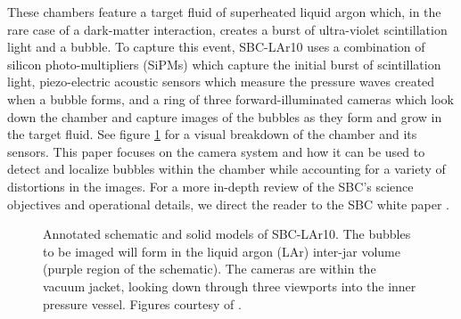 \documentclass[11pt, letterpaper]{extarticle} %
\begin{document}
These chambers feature a target fluid of superheated liquid argon which, in the rare case of a dark-matter interaction, creates a burst of ultra-violet scintillation light and a bubble. To capture this event, SBC-LAr10 uses a combination of silicon photo-multipliers (SiPMs) which capture the initial burst of scintillation light, piezo-electric acoustic sensors which measure the pressure waves created when a bubble forms, and a ring of three forward-illuminated cameras which look down the chamber and capture images of the bubbles as they form and grow in the target fluid. See figure \ref{fig:chamber_schematic} for a visual breakdown of the chamber and its sensors. This paper focuses on the camera system and how it can be used to detect and localize bubbles within the chamber while accounting for a variety of distortions in the images. For a more in-depth review of the SBC's science objectives and operational details, we direct the reader to the SBC white paper \cite{alfonso2022snowmass}. 

\begin{figure}[h]
    \centering
    \hfill
    \caption{Annotated schematic and solid models of SBC-LAr10. The bubbles to be imaged will form in the liquid argon (LAr) inter-jar volume (purple region of the schematic). The cameras are within the vacuum jacket, looking down through three viewports into the inner pressure vessel. Figures courtesy of \cite{alfonso2022snowmass, alfonso2023scintillating}.}
    \label{fig:chamber_schematic}
\end{figure}
\end{document}

